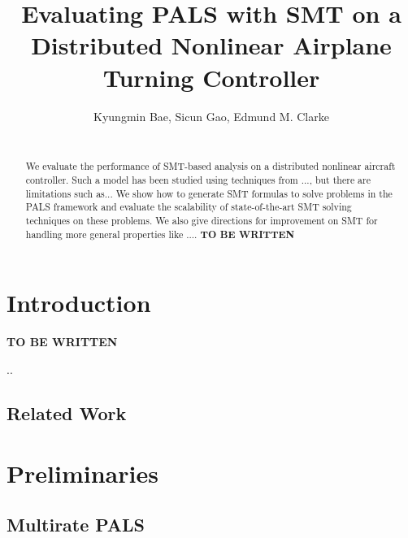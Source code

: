 \documentclass{sig-alternate}
\begin{document}
\title{Evaluating PALS with SMT on a Distributed Nonlinear Airplane Turning Controller
}

\author{
Kyungmin Bae, Sicun Gao, Edmund M. Clarke\\
\\
}

\maketitle
\begin{abstract}
We evaluate the performance of SMT-based analysis on a distributed
nonlinear aircraft controller. Such a model has been studied using
techniques from ..., but there are limitations such as... We show how
to generate SMT formulas to solve problems in the PALS framework and
evaluate the scalability of state-of-the-art SMT solving techniques on
these problems. We also give directions for improvement on SMT for
handling more general properties like ....
\textbf{TO BE WRITTEN}
\end{abstract}

\section{Introduction}

\textbf{TO BE WRITTEN}

\newpage
..


\subsection{Related Work}

\newpage



\section{Preliminaries}

\subsection{Multirate PALS} 
\end{document}
